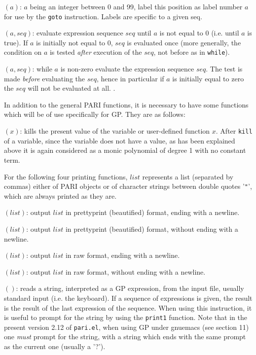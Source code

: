 $(a)$: $a$ being an integer between 0 and 99, label this
position as label number $a$ for use by the {\tt goto} instruction. Labels
are specific to a given seq.

$(a,seq)$: evaluate expression sequence $seq$ until $a$ is not
equal to 0 (i.e. until $a$ is true). If $a$ is initially not equal to 0, $seq$ is
evaluated once (more generally, the condition on $a$ is tested {\sl after} execution of
the $seq$, not before as in {\tt while}).

$(a,seq)$: while $a$ is non-zero evaluate the expression sequence
$seq$. The test is made {\sl before} evaluating the $seq$, hence in particular if $a$
is initially equal to zero the $seq$ will not be evaluated at all.
\smallskip
{}.

In addition to the general PARI functions, it is necessary to have some functions
which will be of use specifically for GP. They are as follows:

$(x)$: kills the present value of the variable or user-defined
function $x$. After {\tt kill} of a variable, since the variable does not have a value,
as has been explained above it is again considered as a monic polynomial of degree 1
with no constant term.

For the following four printing functions, $list$ represents a list (separated by
commas) either of PARI objects or of character strings between double quotes
'{\tt "}', which are always printed as they are.

$(list)$: output $list$ in prettyprint (beautified) format,
ending with a newline.

$(list)$: output $list$ in prettyprint (beautified) format,
without ending with a newline.

$(list)$: output $list$ in raw format, ending with a newline.

$(list)$: output $list$ in raw format, without ending with a 
newline.

$()$: reads a string, interpreted as a GP expression, from
the input file, usually standard input (i.e. the keyboard). If a sequence of
expressions is given, the result is the result of the last expression of the
sequence. When using this instruction, it is useful to prompt for the string
by using the {\tt print1} function. Note that in the present version 2.12 of
{\tt pari.el}, when using GP under gnuemacs (see section 11) one {\sl must\/}
prompt for the string, with a string which ends with the same prompt as the
current one (usually a '?').

